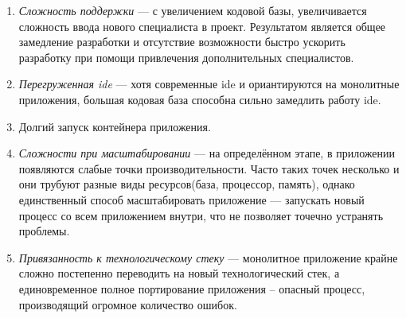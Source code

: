 \begin{enumerate}
	\item \emph{Сложность поддержки} --- с увеличением кодовой базы, увеличивается сложность ввода нового специалиста в проект. Результатом является общее замедление разработки и отсутствие возможности быстро ускорить разработку при помощи привлечения дополнительных специалистов.
	\item \emph{Перегруженная \gls{ide}} --- хотя современные \gls{ide} и ориантируются на монолитные приложения, большая кодовая база способна сильно замедлить работу \gls{ide}.
	\item Долгий запуск контейнера приложения.
	\item \emph{Сложности при масштабировании} --- на определённом этапе, в приложении появляются слабые точки производительности. Часто таких точек несколько и они трубуют разные виды ресурсов(база, процессор, память), однако единственный способ масштабировать приложение --- запускать новый процесс со всем приложением внутри, что не позволяет точечно устранять проблемы.
	\item \emph{Привязанность к технологическому стеку} --- монолитное приложение крайне сложно постепенно переводить на новый технологический стек, а единовременное полное портирование приложения -- опасный процесс, производящий огромное количество ошибок.
\end{enumerate}
